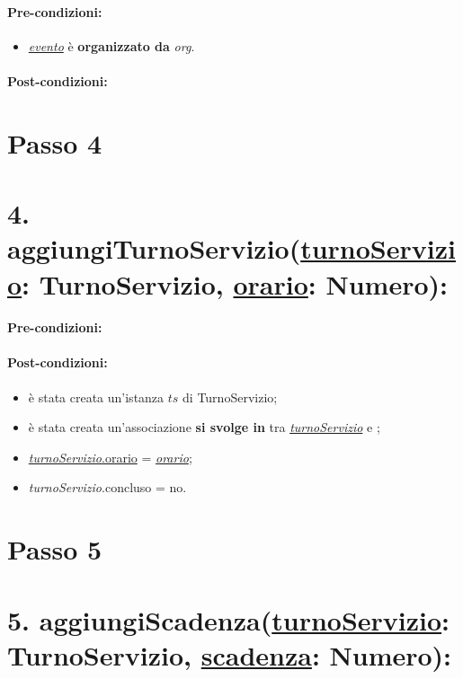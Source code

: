 {\paragraph{Pre-condizioni:}
\begin{itemize}
     \item \underline{\textit{evento}} è \textbf{organizzato da} {\textit{org}}.
\end{itemize}

\paragraph{Post-condizioni:}


\section{Passo 4}
\section*{4. aggiungiTurnoServizio(\underline{turnoServizio}: TurnoServizio, \underline{orario}: Numero):}

\paragraph{Pre-condizioni:}

\paragraph{Post-condizioni:}
\begin{itemize}
    \item è stata creata un'istanza $ts$ di TurnoServizio;
   \item è stata creata un'associazione \textbf{si svolge in} tra \underline{\textit{turnoServizio}} e ;
    \item \underline{\textit{turnoServizio}.orario} = \underline{\textit{orario}};
    \item \textit{turnoServizio}.concluso  = no.
\end{itemize}


\section{Passo 5}
\section*{5. aggiungiScadenza(\underline{turnoServizio}: TurnoServizio, \underline{scadenza}: Numero):}

}
